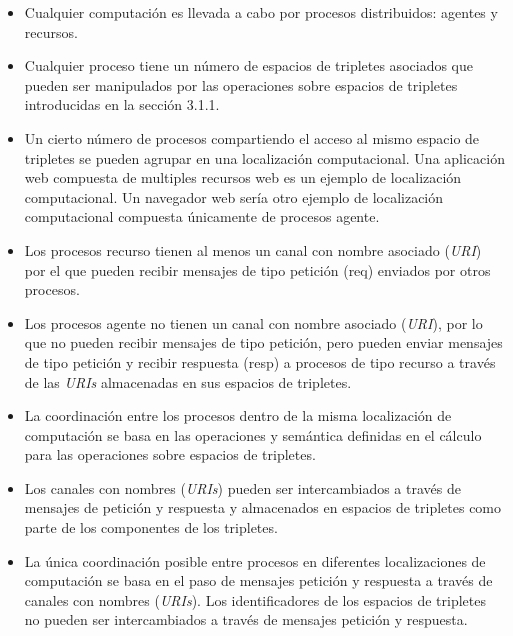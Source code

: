 \begin{itemize}
\item Cualquier computaci\'on es llevada a cabo por procesos distribuidos: agentes y recursos.
\item Cualquier proceso tiene un n\'umero de espacios de tripletes asociados que pueden ser manipulados por las operaciones sobre espacios de tripletes introducidas en la secci\'on 3.1.1.
\item Un cierto n\'umero de procesos compartiendo el acceso al mismo espacio de tripletes se pueden agrupar en una localizaci\'on computacional. Una aplicaci\'on web compuesta de multiples recursos web es un ejemplo de localizaci\'on computacional. Un navegador web ser\'ia otro ejemplo de localizaci\'on computacional compuesta \'unicamente de procesos agente.
\item Los procesos recurso tienen al menos un canal con nombre asociado (\textit{URI}) por el que pueden recibir mensajes de tipo petici\'on (req) enviados por otros procesos.
\item Los procesos agente no tienen un canal con nombre asociado (\textit{URI}), por lo que no pueden recibir mensajes de tipo petici\'on, pero pueden enviar mensajes de tipo petici\'on y recibir respuesta (resp) a procesos de tipo recurso a trav\'es de las \textit{URIs} almacenadas en sus espacios de tripletes.
\item La coordinaci\'on entre los procesos dentro de la misma localizaci\'on de computaci\'on se basa en las operaciones y sem\'antica definidas en el c\'alculo para las operaciones sobre espacios de tripletes.
\item Los canales con nombres (\textit{URIs}) pueden ser intercambiados a trav\'es de mensajes de petici\'on y respuesta y almacenados en espacios de tripletes como parte de los componentes de los tripletes.
\item La \'unica coordinaci\'on posible entre procesos en diferentes localizaciones de computaci\'on se basa en el paso de mensajes petici\'on y respuesta a trav\'es de canales con nombres (\textit{URIs}). Los identificadores de los espacios de tripletes no pueden ser intercambiados a trav\'es de mensajes petici\'on y respuesta.
\end{itemize}

